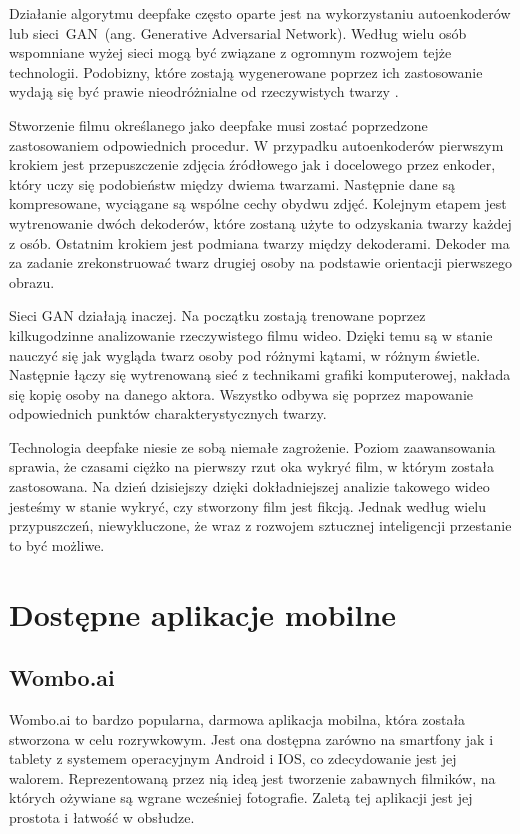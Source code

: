 Działanie algorytmu deepfake często oparte jest na wykorzystaniu autoenkoderów lub sieci~GAN~(ang. Generative Adversarial Network). Według wielu osób wspomniane wyżej sieci mogą być związane z ogromnym rozwojem tejże technologii. Podobizny, które zostają wygenerowane poprzez ich zastosowanie wydają się być prawie nieodróżnialne od rzeczywistych twarzy \cite{deepfake}.

Stworzenie filmu określanego jako deepfake musi zostać poprzedzone zastosowaniem odpowiednich procedur. W przypadku autoenkoderów pierwszym krokiem jest przepuszczenie zdjęcia źródłowego jak i docelowego przez enkoder, który uczy się podobieństw między dwiema twarzami. Następnie dane są kompresowane, wyciągane są wspólne cechy obydwu zdjęć. Kolejnym etapem jest wytrenowanie dwóch dekoderów, które zostaną użyte to odzyskania twarzy każdej z osób. Ostatnim krokiem jest podmiana twarzy między dekoderami. Dekoder ma za zadanie zrekonstruować twarz drugiej osoby na podstawie orientacji pierwszego obrazu. 

Sieci GAN działają inaczej. Na początku zostają trenowane poprzez kilkugodzinne analizowanie rzeczywistego filmu wideo. Dzięki temu są w stanie nauczyć się jak wygląda twarz osoby pod różnymi kątami, w różnym świetle. Następnie łączy się wytrenowaną sieć z technikami grafiki komputerowej, nakłada się kopię osoby na danego aktora. Wszystko odbywa się poprzez mapowanie odpowiednich punktów charakterystycznych twarzy.

Technologia deepfake niesie ze sobą niemałe zagrożenie. Poziom zaawansowania sprawia, że czasami ciężko na pierwszy rzut oka wykryć film, w którym została zastosowana. Na dzień dzisiejszy dzięki dokładniejszej analizie takowego wideo jesteśmy w stanie wykryć, czy stworzony film jest fikcją. Jednak według wielu przypuszczeń, niewykluczone, że wraz z rozwojem sztucznej inteligencji przestanie to być możliwe.


\section{Dostępne aplikacje mobilne}

\subsection{Wombo.ai}
Wombo.ai \cite{womboai} to bardzo popularna, darmowa aplikacja mobilna, która została stworzona w celu rozrywkowym. Jest ona dostępna zarówno na smartfony jak i tablety z systemem operacyjnym Android i IOS, co zdecydowanie jest jej walorem. Reprezentowaną przez nią ideą jest tworzenie zabawnych filmików, na których ożywiane są wgrane wcześniej fotografie. Zaletą tej aplikacji jest jej prostota i łatwość w obsłudze. 

